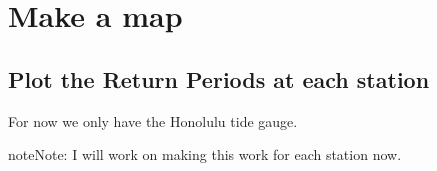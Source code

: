 \documentclass[letterpaper,10pt,english]{jupyterBook}
\begin{document}
\chapter{Make a map}
\label{\detokenize{notebooks/regional_and_local/SL_Extremes_annual:make-a-map}}

\section{Plot the Return Periods at each station}
\label{\detokenize{notebooks/regional_and_local/SL_Extremes_annual:plot-the-return-periods-at-each-station}}
\sphinxAtStartPar
For now we only have the Honolulu tide gauge.

\begin{sphinxadmonition}{note}{Note:}
\sphinxAtStartPar
I will work on making this work for each station now.
\end{sphinxadmonition}
\end{document}
